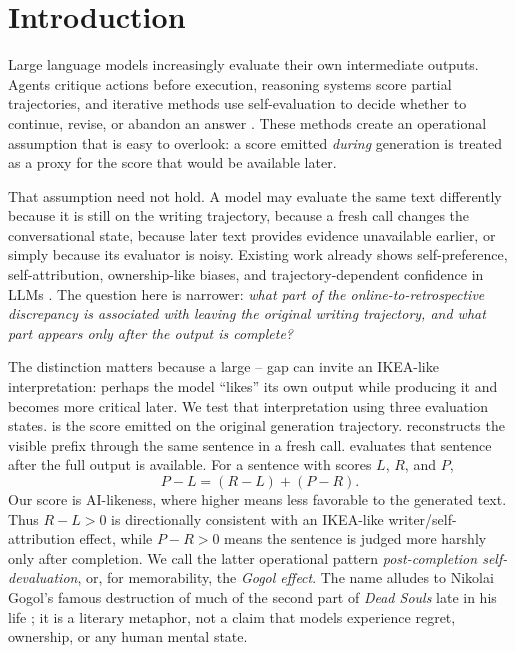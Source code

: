 \section{Introduction}
Large language models increasingly evaluate their own intermediate outputs. Agents critique actions before execution, reasoning systems score partial trajectories, and iterative methods use self-evaluation to decide whether to continue, revise, or abandon an answer \citep{madaan2023selfrefine,shinn2023reflexion,lightman2023verify,snell2024testtime}. These methods create an operational assumption that is easy to overlook: a score emitted \emph{during} generation is treated as a proxy for the score that would be available later.

That assumption need not hold. A model may evaluate the same text differently because it is still on the writing trajectory, because a fresh call changes the conversational state, because later text provides evidence unavailable earlier, or simply because its evaluator is noisy. Existing work already shows self-preference, self-attribution, ownership-like biases, and trajectory-dependent confidence in LLMs \citep{panickssery2024recognize,xu2024pride,khullar2026selfattribution,sanzguerrero2026ownership,han2025finece,gai2026premature,yang2026mirage}. The question here is narrower: \emph{what part of the online-to-retrospective discrepancy is associated with leaving the original writing trajectory, and what part appears only after the output is complete?}

The distinction matters because a large \live{}--\post{} gap can invite an IKEA-like interpretation: perhaps the model ``likes'' its own output while producing it and becomes more critical later. We test that interpretation using three evaluation states. \live{} is the score emitted on the original generation trajectory. \replay{} reconstructs the visible prefix through the same sentence in a fresh call. \post{} evaluates that sentence after the full output is available. For a sentence with scores $L$, $R$, and $P$,
\begin{equation}
P-L=(R-L)+(P-R).
\label{eq:decomp}
\end{equation}
Our score is AI-likeness, where higher means less favorable to the generated text. Thus $R-L>0$ is directionally consistent with an IKEA-like writer/self-attribution effect, while $P-R>0$ means the sentence is judged more harshly only after completion. We call the latter operational pattern \emph{post-completion self-devaluation}, or, for memorability, the \emph{Gogol effect}. The name alludes to Nikolai Gogol's famous destruction of much of the second part of \emph{Dead Souls} late in his life \citep{gogolbio}; it is a literary metaphor, not a claim that models experience regret, ownership, or any human mental state.

